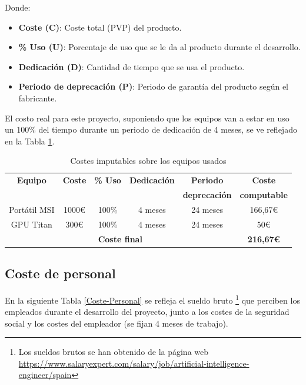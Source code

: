 \documentclass[12pt,a4paper,onecolumn,oneside]{report}
\begin{document}
Donde:
\begin{itemize}
    \item \textbf{Coste (C)}: Coste total (PVP) del producto.
    
    \item \textbf{\% Uso (U)}: Porcentaje de uso que se le da al producto durante el desarrollo.
    
    \item \textbf{Dedicación (D)}: Cantidad de tiempo que se usa el producto.
    
    \item \textbf{Periodo de deprecación (P)}: Periodo de garantía del producto según el fabricante.
\end{itemize}

El costo real para este proyecto, suponiendo que los equipos van a estar en uso un 100\% del tiempo durante un periodo de dedicación de 4 meses, se ve reflejado en la Tabla \ref{Costes-Imp}.

\begin{table}[ht]
    \centering
    \caption{Costes imputables sobre los equipos usados}
    \begin{tabular}{|c|c|c|c|c|c|}
        \hline
        \textbf{Equipo} & \textbf{Coste} & \textbf{\% Uso} & \textbf{Dedicación} & \textbf{Periodo} & \textbf{Coste}\\
        & & & & \textbf{deprecación} & \textbf{computable}\\
        \hline
        Portátil MSI & 1000€ & 100\% & 4 meses & 24 meses & 166,67€\\
        \hline
        GPU Titan & 300€ & 100\% & 4 meses & 24 meses & 50€\\
        \hline
        \multicolumn{5}{|c|}{\textbf{Coste final}} & \textbf{216,67€}\\
        \hline
    \end{tabular}
    \label{Costes-Imp}
\end{table}


\subsection{Coste de personal}

En la siguiente Tabla \ref{Coste-Personal} se refleja el sueldo bruto \footnote{Los sueldos brutos se han obtenido de la página web \url{https://www.salaryexpert.com/salary/job/artificial-intelligence-engineer/spain}} que perciben los empleados durante el desarrollo del proyecto, junto a los costes de la seguridad social y los costes del empleador (se fijan 4 meses de trabajo).
\end{document}
